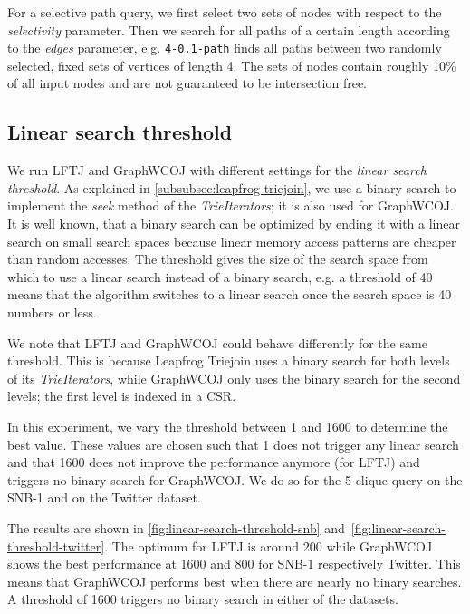 For a selective path query, we first select two sets of nodes with respect to the \textit{selectivity} parameter.
Then we search for all paths of a certain length according to the \textit{edges} parameter, e.g. \texttt{4-0.1-path} finds all
paths between two randomly selected, fixed sets of vertices of length 4.
The sets of nodes contain roughly 10\% of all input nodes and are
not guaranteed to be intersection free.

\subsection{Linear search threshold}\label{subsec:linear-search-threshold}

We run \textsc{LFTJ} and GraphWCOJ with different settings for the \textit{linear search threshold}.
As explained in \cref{subsubsec:leapfrog-triejoin}, we use a binary search to implement the \textit{seek}
method of the \textit{TrieIterators};
it is also used for GraphWCOJ.
It is well known, that a binary search can be optimized by ending it with a linear search on small
search spaces because linear memory access patterns are cheaper than random accesses.
The threshold gives the size of the search space from which to use a linear search instead of
a binary search, e.g. a threshold of 40 means that the algorithm switches to a linear search
once the search space is 40 numbers or less.

We note that \textsc{LFTJ} and GraphWCOJ could behave differently for the same threshold.
This is because Leapfrog Triejoin uses a binary search for both levels of its \textit{TrieIterators},
while GraphWCOJ only uses the binary search for the second levels;
the first level is indexed in a \textsc{CSR}.

In this experiment, we vary the threshold between 1 and 1600 to determine the best value.
These values are chosen such that 1 does not trigger any linear search and that 1600
does not improve the performance anymore (for \textsc{LFTJ}) and triggers no
binary search for GraphWCOJ.
We do so for the 5-clique query on the SNB-1 and on the Twitter dataset.

The results are shown in \cref{fig:linear-search-threshold-snb} and~\ref{fig:linear-search-threshold-twitter}.
The optimum for LFTJ is around 200 while GraphWCOJ shows the best performance at 1600 and 800 for
SNB-1 respectively Twitter.
This means that GraphWCOJ performs best when there are nearly no binary searches.
A threshold of 1600 triggers no binary search in either of the datasets.

